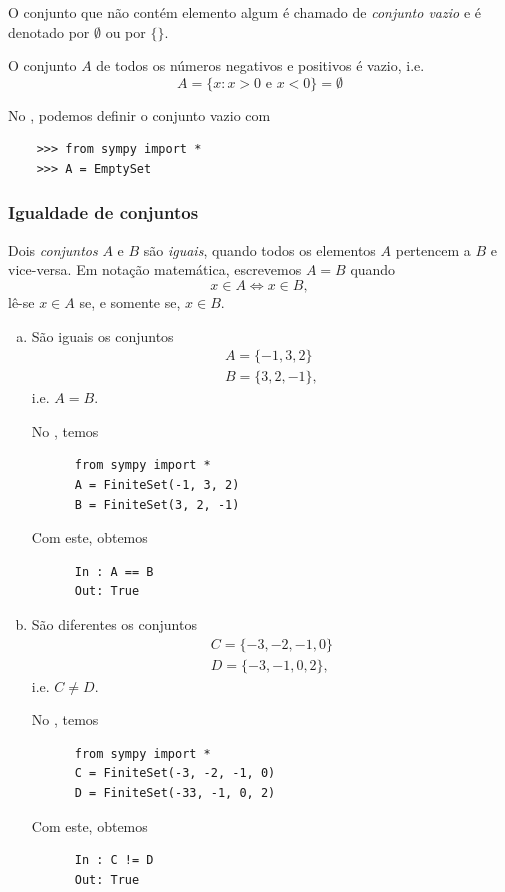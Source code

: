 O conjunto que não contém elemento algum é chamado de \emph{conjunto vazio} e é denotado por $\emptyset$ ou por $\{\}$.

\begin{ex}
  O conjunto $A$ de todos os números negativos e positivos é vazio, i.e.
  \begin{equation}
    A = \{x: x>0\text{ e }x<0\} = \emptyset
  \end{equation}

  \ifispython
  No \python, podemos definir o conjunto vazio com
  \begin{lstlisting}
    >>> from sympy import *
    >>> A = EmptySet
  \end{lstlisting}
  \fi
\end{ex}

\subsubsection{Igualdade de conjuntos}

Dois \emph{conjuntos} $A$ e $B$ são \emph{iguais}, quando todos os elementos $A$ pertencem a $B$ e vice-versa. Em notação matemática, escrevemos $A=B$ quando
\begin{equation}
  x\in A \Leftrightarrow x\in B,
\end{equation}
lê-se $x\in A$ se, e somente se, $x\in B$.

\begin{ex}
  \begin{enumerate}[a)]
  \item São iguais os conjuntos
    \begin{gather}
      A = \{-1, 3, 2\}\\
      B = \{3, 2, -1\},
    \end{gather}
    i.e. $A = B$.

    \ifispython
    No \python, temos
    \begin{lstlisting}
      from sympy import *
      A = FiniteSet(-1, 3, 2)
      B = FiniteSet(3, 2, -1)
    \end{lstlisting}
    Com este, obtemos
    \begin{lstlisting}
      In : A == B
      Out: True
    \end{lstlisting}
    \fi

  \item São diferentes os conjuntos
    \begin{gather}
      C = \{-3, -2, -1, 0\}\\
      D = \{-3, -1, 0, 2\},
    \end{gather}
    i.e. $C\neq D$.

    \ifispython
    No \python, temos
    \begin{lstlisting}
      from sympy import *
      C = FiniteSet(-3, -2, -1, 0)
      D = FiniteSet(-33, -1, 0, 2)
    \end{lstlisting}
    Com este, obtemos
    \begin{lstlisting}
      In : C != D
      Out: True
    \end{lstlisting}
    \fi
  \end{enumerate}
\end{ex}

